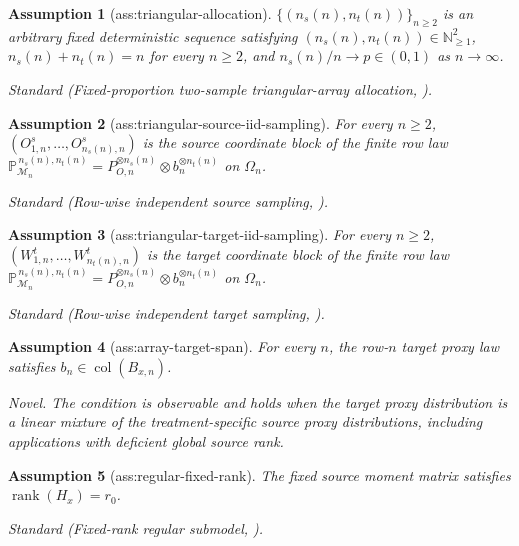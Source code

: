 \documentclass{article}
\newtheorem{assumption}{Assumption}
\begin{document}
\begin{assumption}[ass:triangular-allocation]\label{ass:triangular-allocation}
\(\{(n_s(n),n_t(n))\}_{n\ge2}\) is an arbitrary fixed deterministic sequence satisfying \((n_s(n),n_t(n))\in\mathbb N_{\ge1}^{2}\), \(n_s(n)+n_t(n)=n\) for every \(n\ge2\), and \(n_s(n)/n\to p\in(0,1)\) as \(n\to\infty\).
\par\smallskip\noindent\emph{Standard} (Fixed-proportion two-sample triangular-array allocation, \cite{IglesiasAlonsoEtAl2025}).
\end{assumption}

\begin{assumption}[ass:triangular-source-iid-sampling]\label{ass:triangular-source-iid-sampling}
For every \(n\ge2\), \((O^s_{1,n},\ldots,O^s_{n_s(n),n})\) is the source coordinate block of the finite row law \(\mathbb P_{\mathcal M_n}^{\,n_s(n),n_t(n)}=P_{O,n}^{\otimes n_s(n)}\otimes b_n^{\otimes n_t(n)}\) on \(\Omega_n\).
\par\smallskip\noindent\emph{Standard} (Row-wise independent source sampling, \cite{IglesiasAlonsoEtAl2025}).
\end{assumption}

\begin{assumption}[ass:triangular-target-iid-sampling]\label{ass:triangular-target-iid-sampling}
For every \(n\ge2\), \((W^t_{1,n},\ldots,W^t_{n_t(n),n})\) is the target coordinate block of the finite row law \(\mathbb P_{\mathcal M_n}^{\,n_s(n),n_t(n)}=P_{O,n}^{\otimes n_s(n)}\otimes b_n^{\otimes n_t(n)}\) on \(\Omega_n\).
\par\smallskip\noindent\emph{Standard} (Row-wise independent target sampling, \cite{IglesiasAlonsoEtAl2025}).
\end{assumption}

\begin{assumption}[ass:array-target-span]\label{ass:array-target-span}
For every \(n\), the row-\(n\) target proxy law satisfies \(b_n\in\operatorname{col}(B_{x,n})\).
\par\smallskip\noindent\emph{Novel.} The condition is observable and holds when the target proxy distribution is a linear mixture of the treatment-specific source proxy distributions, including applications with deficient global source rank.
\end{assumption}

\begin{assumption}[ass:regular-fixed-rank]\label{ass:regular-fixed-rank}
The fixed source moment matrix satisfies \(\operatorname{rank}(H_x)=r_0\).
\par\smallskip\noindent\emph{Standard} (Fixed-rank regular submodel, \cite{AndrewsGuggenberger2019}).
\end{assumption}
\end{document}
